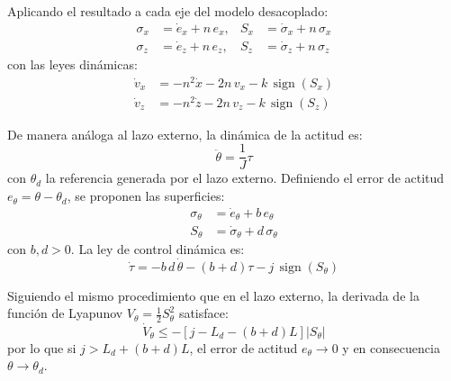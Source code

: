 \begin{enumerate}
\begin{itemize}
        Aplicando el resultado a cada eje del modelo desacoplado:
        \begin{equation*}
            \begin{aligned}
                \sigma_x &= \dot{e}_x + n\,e_x, & S_x &= \dot{\sigma}_x + n\,\sigma_x \\
                \sigma_z &= \dot{e}_z + n\,e_z, & S_z &= \dot{\sigma}_z + n\,\sigma_z
            \end{aligned}
        \end{equation*}
        con las leyes dinámicas:
        \begin{equation*}
            \begin{aligned}
                \dot{v}_x &= -n^2\dot{x} - 2n\,v_x - k\,\operatorname{sign}(S_x) \\
                \dot{v}_z &= -n^2\dot{z} - 2n\,v_z - k\,\operatorname{sign}(S_z)
            \end{aligned}
        \end{equation*}

        De manera análoga al lazo externo, la dinámica de la actitud es:
        \begin{equation*}
            \ddot{\theta} = \frac{1}{J}\tau
        \end{equation*}
        con $\theta_d$ la referencia generada por el lazo externo. Definiendo el error de actitud $e_\theta = \theta - \theta_d$, se proponen las superficies:
        \begin{equation*}
            \begin{aligned}
                \sigma_\theta &= \dot{e}_\theta + b\,e_\theta \\
                S_\theta &= \dot{\sigma}_\theta + d\,\sigma_\theta
            \end{aligned}
        \end{equation*}
        con $b, d > 0$. La ley de control dinámica es:
        \begin{equation*}
            \dot{\tau} = -b\,d\,\dot{\theta} - (b+d)\tau - j\,\operatorname{sign}(S_\theta)
        \end{equation*}

        Siguiendo el mismo procedimiento que en el lazo externo, la derivada de la función de Lyapunov $V_\theta = \tfrac{1}{2}S_\theta^2$ satisface:
        \begin{equation*}
            \dot{V}_\theta \le -\left[j - L_d - (b+d)L\right]|S_\theta|
        \end{equation*}
        por lo que si $j > L_d + (b+d)L$, el error de actitud $e_\theta\to 0$ y en consecuencia $\theta\to\theta_d$.\\
















\end{itemize}
\end{enumerate}
